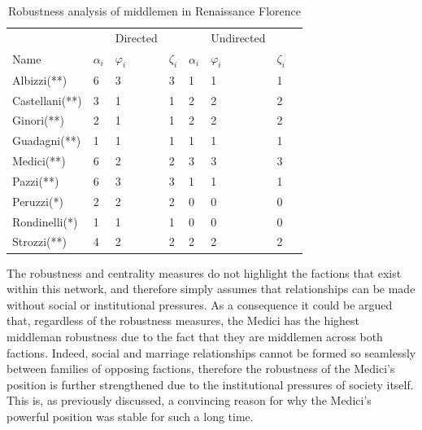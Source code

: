 \begin{table}[]
\centering
\begin{tabu} to \textwidth {X[l]  X[c]  X[c]  X[c] || X[c]  X[c]  X[c]  X[c]} 
\hline \hline
               &              & Directed    &              &              & Undirected  &              \\
Name           & $\alpha_{i}$ & $\varphi_{i}$ & $\zeta_{i}$ & $\alpha_{i}$ & $\varphi_{i}$ & $\zeta_{i}$ \\ \hline
Albizzi(**)    & 6            & 3           & 3            & 1            & 1           & 1            \\
Castellani(**) & 3            & 1           & 1            & 2            & 2           & 2            \\
Ginori(**)     & 2            & 1           & 1            & 2            & 2           & 2            \\
Guadagni(**)   & 1            & 1           & 1            & 1            & 1           & 1            \\
Medici(**)     & 6            & 2           & 2            & 3            & 3           & 3            \\
Pazzi(**)      & 6            & 3           & 3            & 1            & 1           & 1            \\
Peruzzi(*)     & 2            & 2           & 2            & 0            & 0           & 0            \\
Rondinelli(*)  & 1            & 1           & 1            & 0            & 0           & 0            \\
Strozzi(**)    & 4            & 2           & 2            & 2            & 2           & 2            \\ \hline
\end{tabu}
\caption{Robustness analysis of middlemen in Renaissance Florence}
\label{FlorenceRobust}
\end{table}

The robustness and centrality measures do not highlight the factions that exist within this network, and therefore simply assumes that relationships can be made without social or institutional pressures. As a consequence it could be argued that, regardless of the robustness measures, the Medici has the highest middleman robustness due to the fact that they are middlemen across both factions. Indeed, social and marriage relationships cannot be formed so seamlessly between families of opposing factions, therefore the robustness of the Medici's position is further strengthened due to the institutional pressures of society itself. This is, as previously discussed, a convincing reason for why the Medici's powerful position was stable for such a long time.


